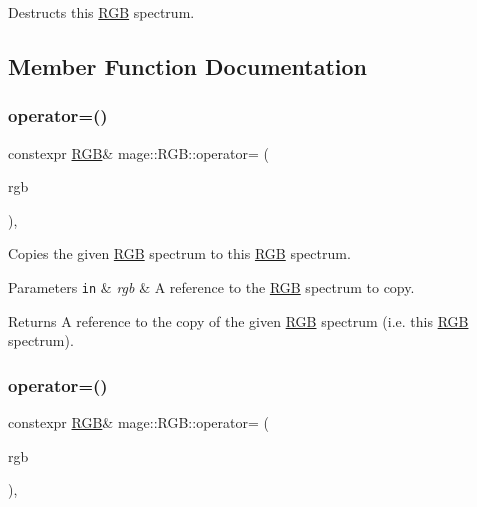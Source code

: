 Destructs this \hyperlink{structmage_1_1_r_g_b}{R\+GB} spectrum. 

\subsection{Member Function Documentation}
\hypertarget{structmage_1_1_r_g_b_ad78ad1a23b801b19a0e8f747dec8637d}{}\label{structmage_1_1_r_g_b_ad78ad1a23b801b19a0e8f747dec8637d} 
\subsubsection{\texorpdfstring{operator=()}{operator=()}\hspace{0.1cm}{\footnotesize\ttfamily [1/2]}}
{\footnotesize\ttfamily constexpr \hyperlink{structmage_1_1_r_g_b}{R\+GB}\& mage\+::\+R\+G\+B\+::operator= (\begin{DoxyParamCaption}\item[{const \hyperlink{structmage_1_1_r_g_b}{R\+GB} \&}]{rgb }\end{DoxyParamCaption})\hspace{0.3cm}{\ttfamily [default]}, {\ttfamily [noexcept]}}

Copies the given \hyperlink{structmage_1_1_r_g_b}{R\+GB} spectrum to this \hyperlink{structmage_1_1_r_g_b}{R\+GB} spectrum.


\begin{DoxyParams}[1]{Parameters}
\mbox{\tt in}  & {\em rgb} & A reference to the \hyperlink{structmage_1_1_r_g_b}{R\+GB} spectrum to copy. \\
\hline
\end{DoxyParams}
\begin{DoxyReturn}{Returns}
A reference to the copy of the given \hyperlink{structmage_1_1_r_g_b}{R\+GB} spectrum (i.\+e. this \hyperlink{structmage_1_1_r_g_b}{R\+GB} spectrum). 
\end{DoxyReturn}
\hypertarget{structmage_1_1_r_g_b_a87257a9536e7b2eabd49553df67e8945}{}\label{structmage_1_1_r_g_b_a87257a9536e7b2eabd49553df67e8945} 
\subsubsection{\texorpdfstring{operator=()}{operator=()}\hspace{0.1cm}{\footnotesize\ttfamily [2/2]}}
{\footnotesize\ttfamily constexpr \hyperlink{structmage_1_1_r_g_b}{R\+GB}\& mage\+::\+R\+G\+B\+::operator= (\begin{DoxyParamCaption}\item[{\hyperlink{structmage_1_1_r_g_b}{R\+GB} \&\&}]{rgb }\end{DoxyParamCaption})\hspace{0.3cm}{\ttfamily [default]}, {\ttfamily [noexcept]}}

